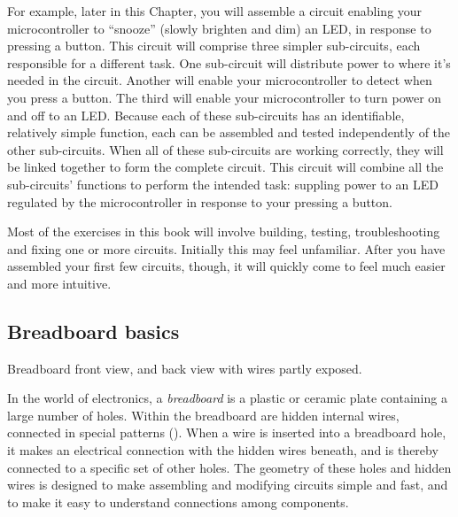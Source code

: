 For example, later in this Chapter, you will assemble a circuit enabling your microcontroller to ``snooze'' (slowly brighten and dim) an LED, in response to pressing a button.
This circuit will comprise three  simpler sub-circuits, each responsible for a different task.
One sub-circuit will distribute power to where it's needed in the circuit.
Another will enable your microcontroller to detect when you press a button.
The third will enable your microcontroller to turn power on and off to an LED.
Because each of these sub-circuits has an identifiable, relatively simple function, each can be assembled and tested independently of the other sub-circuits.
When all of these sub-circuits are working correctly, they will be linked together to form the complete circuit.
This circuit will combine all the sub-circuits' functions to perform the intended task: suppling power to an LED regulated by the microcontroller in response to your pressing a button.

Most of the exercises in this book will involve building, testing, troubleshooting and fixing one or more circuits.
Initially this may feel unfamiliar.
After you have assembled your first few circuits, though, it will quickly come to feel much easier and more intuitive.

\subsection{Breadboard basics}
\begin{marginfigure}[-10.cm]
	\begin{center}
		\caption[Breadboard front/back]{Breadboard front view, and back view with wires partly exposed.}
	\end{center}
\end{marginfigure}
In the world of electronics, a \emph{breadboard} is a plastic or ceramic plate containing a large number of holes.
Within the breadboard are hidden internal wires, connected in special patterns ().
When a wire is inserted into a breadboard hole, it makes an electrical connection with the hidden wires beneath, and is thereby connected to a specific set of other holes. %
The geometry of these holes and hidden wires is designed to make assembling and modifying circuits simple and fast, and to make it easy to understand connections among components.


